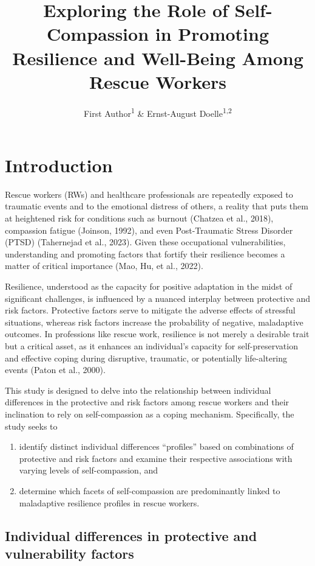 \documentclass[
  man,floatsintext]{apa7}
\title{Exploring the Role of Self-Compassion in Promoting Resilience and Well-Being Among Rescue Workers}
\author{First Author\textsuperscript{1} \& Ernst-August Doelle\textsuperscript{1,2}}
\date{}
\affiliation{\vspace{0.5cm}\textsuperscript{1} Wilhelm-Wundt-University\\\textsuperscript{2} Konstanz Business School}
\providecommand{\tightlist}{%
  \setlength{\itemsep}{0pt}\setlength{\parskip}{0pt}}
\begin{document}
\maketitle

\hypertarget{introduction}{%
\section{Introduction}\label{introduction}}

Rescue workers (RWs) and healthcare professionals are repeatedly exposed to traumatic events and to the emotional distress of others, a reality that puts them at heightened risk for conditions such as burnout (Chatzea et al., 2018), compassion fatigue (Joinson, 1992), and even Post-Traumatic Stress Disorder (PTSD) (Tahernejad et al., 2023). Given these occupational vulnerabilities, understanding and promoting factors that fortify their resilience becomes a matter of critical importance (Mao, Hu, et al., 2022).

Resilience, understood as the capacity for positive adaptation in the midst of significant challenges, is influenced by a nuanced interplay between protective and risk factors. Protective factors serve to mitigate the adverse effects of stressful situations, whereas risk factors increase the probability of negative, maladaptive outcomes. In professions like rescue work, resilience is not merely a desirable trait but a critical asset, as it enhances an individual's capacity for self-preservation and effective coping during disruptive, traumatic, or potentially life-altering events (Paton et al., 2000).

This study is designed to delve into the relationship between individual differences in the protective and risk factors among rescue workers and their inclination to rely on self-compassion as a coping mechanism. Specifically, the study seeks to

\begin{enumerate}
\def\labelenumi{\arabic{enumi}.}
\tightlist
\item
  identify distinct individual differences ``profiles'' based on combinations of protective and risk factors and examine their respective associations with varying levels of self-compassion, and
\item
  determine which facets of self-compassion are predominantly linked to maladaptive resilience profiles in rescue workers.
\end{enumerate}

\hypertarget{individual-differences-in-protective-and-vulnerability-factors}{%
\subsection{Individual differences in protective and vulnerability factors}\label{individual-differences-in-protective-and-vulnerability-factors}}
\end{document}
